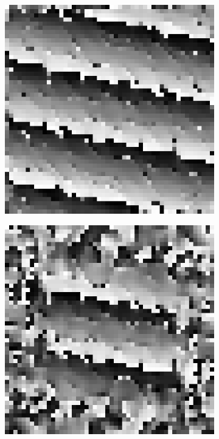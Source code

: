 \begin{figure}[htpb]
\centering
\begin{subfigure}{.25\textwidth}
\includegraphics[width=1\textwidth]{img/PhaseDifferenceSigma0}
\end{subfigure}%
\begin{subfigure}{.25\textwidth}
\includegraphics[width=1\textwidth]{img/PhaseDifferenceSigma75}

\end{subfigure}
\end{figure}

